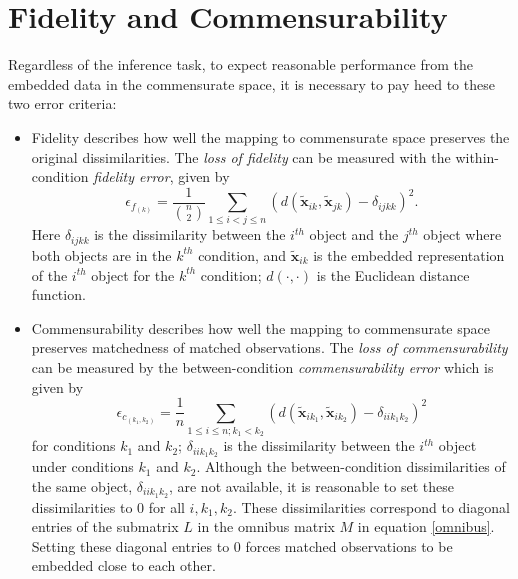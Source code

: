 \documentclass[12pt]{article} %
\begin{document}
\section{Fidelity and Commensurability\label{sec:FidComm}}



Regardless of the inference task,  to expect reasonable performance from the embedded data in the commensurate space, 
it is necessary to pay heed to these two error criteria: %

\begin{itemize}
\item Fidelity describes how well the mapping to commensurate space preserves the original dissimilarities. The \emph{loss of fidelity} can be measured with the  within-condition \emph{ fidelity error}, given by
    \[
\epsilon_{f_{(k)}} = \frac{1}{{{n}\choose{2}}} \sum_{1 \leq i < j \leq n} (d(\widetilde{\bm{x}}_{ik},\widetilde{\bm{x}}_{jk})-\delta_{ijkk})^2
.\] 
Here $\delta_{ijkk}$ is the dissimilarity between the $i^{th}$ object and the $j^{th}$ object where both objects are in the $k^{th}$  condition, and $\widetilde{\bm{x}}_{ik}$ is the embedded representation of the $i^{th}$ object  for the $k^{th}$ condition;  $d(\cdot,\cdot)$ is the Euclidean distance function.

\item Commensurability describes how well the mapping to commensurate space preserves matchedness of matched observations. The \emph{loss of commensurability} can be measured by the between-condition {\em commensurability error} which is given by
    \[
\epsilon_{c_{(k_1,k_2)}} = \frac{1}{n} \sum_{1 \leq i \leq n;k_1 <k_2} (d(\widetilde{\bm{x}}_{ik_1},\widetilde{\bm{x}}_{ik_2})- { \delta_{iik_1k_2}})^2
\label{comm-error}
\]
 for conditions $k_1$ and $k_2$; $\delta_{iik_1k_2}$  is the dissimilarity between the $i^{th}$ object under  conditions   $k_1$ and  $k_2$. 
Although  the between-condition dissimilarities of the same object, ${ \delta_{iik_1k_2}}$, are not available,  it is reasonable to set these dissimilarities to $0$ for all $i,k_1,k_2$. These dissimilarities correspond to  diagonal  entries of the  submatrix $L$ in  the omnibus matrix  $M$ in equation \eqref{omnibus}. Setting these diagonal entries to $0$ forces matched observations to be embedded close to each other. \label{commens}  
\end{itemize}
\end{document}

